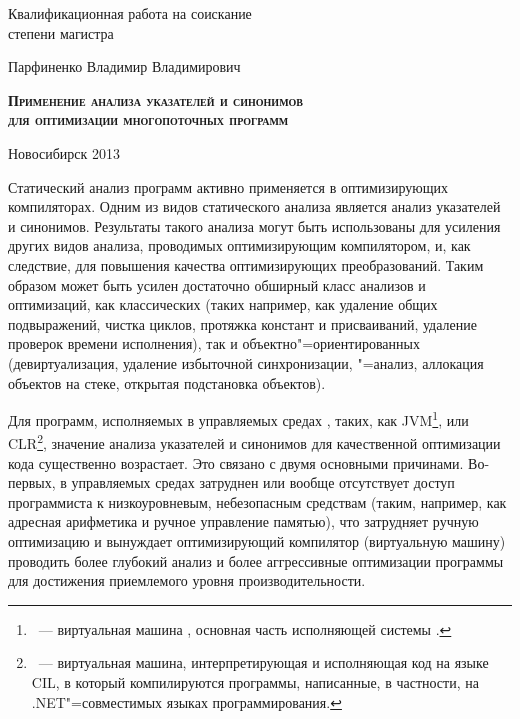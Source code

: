 \documentclass[14pt,titlepage,draft]{extarticle}
\newcommand{\java}{\eng{Java}\xspace}
\begin{document}
\begin{center}
{      Квалификационная работа на соискание\\
      степени магистра

      \vspace{0.5cm}

      {\large Парфиненко Владимир Владимирович}

      \vspace{1.1cm}

      {\large \scshape \bfseries
        Применение анализа указателей и синонимов\\
        для оптимизации многопоточных программ
      }

      \vspace{2.5cm}


      \hfill{}

      \vfill

      Новосибирск 2013
    }
  \end{center}

  \listoftodos

  \tableofcontents


    Статический анализ программ активно применяется в оптимизирующих
    компиляторах. Одним из видов статического анализа является анализ
    указателей и синонимов. Результаты такого анализа могут быть использованы
    для усиления других видов анализа, проводимых оптимизирующим компилятором,
    и, как следствие, для повышения качества оптимизирующих преобразований.
    Таким образом может быть усилен достаточно обширный класс анализов и
    оптимизаций, как классических (таких например, как удаление общих
    подвыражений, чистка циклов, протяжка констант и присваиваний, удаление
    проверок времени исполнения), так и объектно"=ориентированных
    (девиртуализация, удаление избыточной синхронизации, "=анализ,
    аллокация объектов на стеке, открытая подстановка объектов).

    Для программ, исполняемых в управляемых средах , таких, как JVM\footnote{~---
    виртуальная машина \java, основная часть исполняющей системы \java.}, или
    CLR\footnote{~--- виртуальная машина,
    интерпретирующая и исполняющая код на языке CIL, в который компилируются
    программы, написанные, в частности, на .NET"=совместимых языках
    программирования.}, значение анализа указателей и синонимов для
    качественной оптимизации кода существенно возрастает. Это связано с двумя
    основными причинами. Во-первых, в управляемых средах затруднен или вообще
    отсутствует доступ программиста к низкоуровневым, небезопасным средствам
    (таким, например, как адресная арифметика и ручное управление памятью), что
    затрудняет ручную оптимизацию и вынуждает оптимизирующий компилятор
    (виртуальную машину) проводить более глубокий анализ и более аггрессивные
    оптимизации программы для достижения приемлемого уровня производительности.
\end{document}
